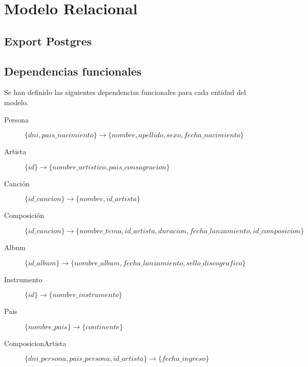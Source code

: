 \documentclass[10pt,a4paper]{article}
\begin{document}
\section{Modelo Relacional}

\subsection{Export Postgres}
%

\subsection{Dependencias funcionales}
Se han definido las siguientes dependencias funcionales para cada entidad del modelo.
\begin{description}

	\item [Persona]
	$	\{ dni, pais\_nacimiento \} \rightarrow \{ nombre, apellido, sexo, fecha\_nacimiento \} $

	\item [Artista]
	$	\{ id \} \rightarrow \{ nombre\_artistico, pais\_consagracion \} $

	\item [Canción]
		$\{ id\_cancion \} \rightarrow \{ nombre, id\_artista \}$

	\item [Composición]
	$\{ id\_cancion \} \rightarrow \{ nombre\_tema, id\_artista, duracion, fecha\_lanzamiento, id\_composicion \}$

	\item [Album]
	$\{ id\_album \} \rightarrow \{ nombre\_album, fecha\_lanzamiento, sello\_discografico \}$

	\item [Instrumento]
	$\{ id\} \rightarrow \{nombre\_instrumento\} $

	\item [Pais]
	$ \{nombre\_pais\} \rightarrow \{continente\} $

	\item [ComposicionArtista]
	$ \{dni\_persona, pais\_persona, id\_artista \} \rightarrow \{ fecha\_ingreso \} $

\end{description}
\end{document}
